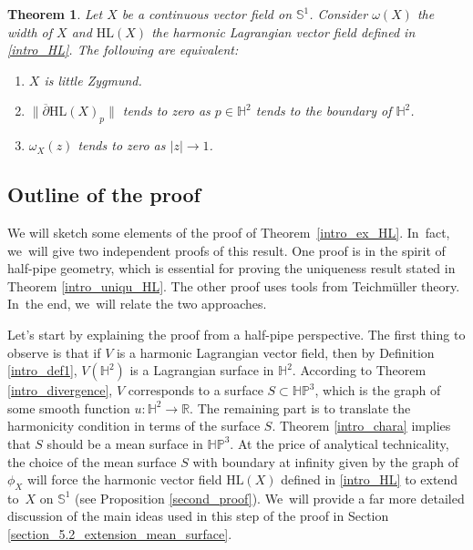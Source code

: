 \documentclass[JEP,XML,SOM,Unicode,NoEqCountersInSection, NoFloatCountersInSection,published]{cedram}
\theoremstyle{plain}
\newtheorem{theorem}[cor]{Theorem}
\theoremstyle{definition}
\newcommand{\HP}{\mathbb{HP}^3}
\begin{document}
\begin{theorem}\label{Intro_chara_little}
Let $X$ be a continuous vector field on $\mathbb{S}^1$. Consider $\omega(X)$ the width of $X$ and $\mathrm{HL}(X)$ the harmonic Lagrangian vector field defined in \eqref{intro_HL}. The following are equivalent:
\begin{enumerate}
\item $X$ is little Zygmund.
\item $\lVert \overline{\partial} \mathrm{HL}(X)_p\rVert$ tends to zero as $p \in \mathbb{H}^2$ tends to the boundary of $\mathbb{H}^2$.
\item $\omega_X(z)$ tends to zero as $\lvert z \rvert \to 1$.
\end{enumerate}
\end{theorem}

\subsection{Outline of the proof}\label{outline_of_the_proof}

We will sketch some elements of the proof of Theorem~\ref{intro_ex_HL}. In~fact, we~will give two independent proofs of this result. One proof is in the spirit of half-pipe geometry, which is essential for proving the uniqueness result stated in Theorem \ref{intro_uniqu_HL}. The other proof uses tools from Teichmüller theory. In~the end, we~will relate the two approaches.

Let's start by explaining the proof from a half-pipe perspective. The first thing to observe is that if \(V \) is a harmonic Lagrangian vector field, then by Definition \ref{intro_def1}, \(V(\mathbb{H}^2) \) is a Lagrangian surface in \(\mathbb{H}^2 \). According to Theorem \ref{intro_divergence}, \(V \) corresponds to a surface \(S \subset \HP \), which is the graph of some smooth function \(u: \mathbb{H}^2 \to \mathbb{R} \). The remaining part is to translate the harmonicity condition in terms of the surface \(S \). Theorem \ref{intro_chara} implies that \(S \) should be a mean surface in \(\HP\). At the price of analytical technicality, the choice of the mean surface \(S \) with boundary at infinity given by the graph of \(\phi_X \) will force the harmonic vector field \(\mathrm{HL}(X)\) defined in \eqref{intro_HL} to extend to~\(X \) on \(\mathbb{S}^1\) (see Proposition \ref{second_proof}). We~will provide a far more detailed discussion of the main ideas used in this step of the proof in Section \ref{section_5.2_extension_mean_surface}.
\end{document}
